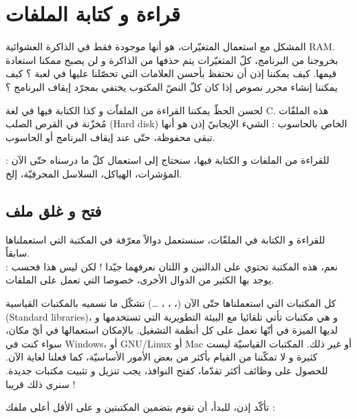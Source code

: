 \chapter{قراءة و كتابة الملفات}

المشكل مع استعمال المتغيّرات، هو أنها موجودة فقط في الذاكرة العشوائية
\textenglish{RAM}.
بخروجنا من البرنامج، كلّ المتغيّرات يتم حذفها من الذاكرة و لن يصبح ممكنا استعادة قيمها. كيف يمكننا إذن أن نحتفظ بأحسن العلامات التي تحصّلنا عليها في لعبة ؟ كيف يمكننا إنشاء محرر نصوص إذا كان كلّ النصّ  المكتوب يختفي بمجرّد إيقاف البرنامج ؟

لحسن الحظّ يمكننا القراءة من الملفاّت و كذا الكتابة فيها في لغة
\textenglish{C}.
هذه الملفّات مُخزّنة في القرص الصلب
(\textenglish{Hard disk})
الخاص بالحاسوب : الشيء الإيجابيّ إذن هو أنها تبقى محفوظة، حتّى عند إيقاف البرنامج أو الحاسوب.

للقراءة من الملفات و الكتابة فيها، سنحتاج إلى استعمال كلّ ما درسناه حتّى الآن : المؤشرات، الهياكل، السلاسل المحرفيّة، إلخ.

\section{فتح و غلق ملف}

للقراءة و الكتابة في الملفّات، سنستعمل دوالاً معرّفة في المكتبة
التي استعملناها سابقاً.\\
نعم، هذه المكتبة تحتوي على الدالتين
و
اللتان نعرفهما جيّدا ! لكن ليس هذا فحسب : يوجد بها الكثير من الدوال الأخرى، خصوصا التي تعمل على الملفات.

\begin{information}
  كل المكتبات التي استعملناها حتّى الآن
(، ، ،  \dots)
تشكّل ما نسميه بالمكتبات القياسية
(\textenglish{Standard libraries})،
و هي مكتبات تأتي تلقائيا مع البيئة التطويرية التي تستخدمها و لديها الميزة في أنّها تعمل على كل أنظمة التشغيل. بالإمكان استعمالها في أيّ مكان، سواء كنت في
\textenglish{Windows}،
أو
\textenglish{GNU/Linux}
أو
\textenglish{Mac}
أو غير ذلك.
المكتبات القياسيّة ليست كثيرة و لا تمكّننا من القيام بأكثر من بعض الأمور الأساسيّة، كما فعلنا لغاية الآن. للحصول على وظائف أكثر تقدّما، كفتح النوافذ، يجب تنزيل و تثبيت مكتبات جديدة. سنرى ذلك قريبا !
\end{information}

تأكّد إذن، للبدأ، أن تقوم بتضمين المكتبتين
و
على الأقل أعلى ملفك
 :

